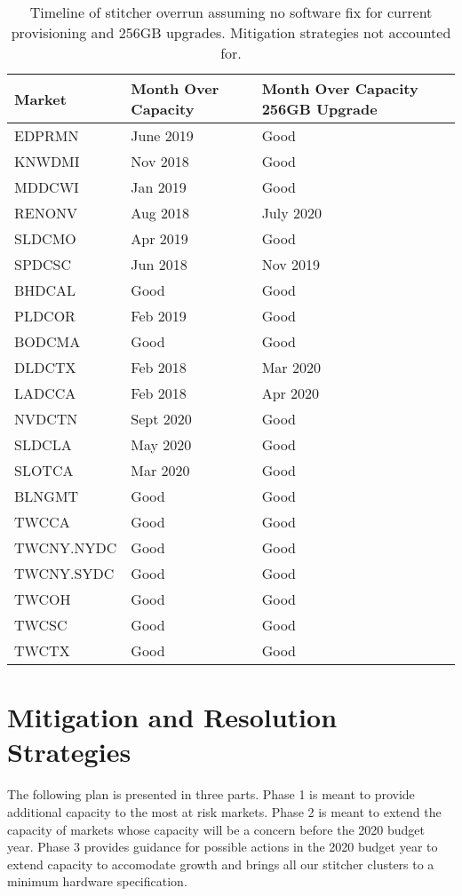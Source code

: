 \documentclass{article}
\begin{document}
\begin{table}
\begin{tabular}{|l|p{22mm}|p{26mm}|} 
\hline Market & Month Over Capacity & Month Over Capacity 256GB Upgrade\\
\hline EDPRMN & June 2019 & Good \\
\hline KNWDMI & Nov 2018 & Good \\
\hline MDDCWI & Jan 2019 & Good \\
\hline RENONV & Aug 2018 & July 2020 \\
\hline SLDCMO & Apr 2019 & Good \\
\hline SPDCSC & Jun 2018 & Nov 2019 \\
\hline BHDCAL & Good & Good \\
\hline PLDCOR & Feb 2019 & Good \\
\hline BODCMA & Good & Good \\
\hline DLDCTX & Feb 2018 & Mar 2020 \\
\hline LADCCA & Feb 2018 & Apr 2020\\
\hline NVDCTN & Sept 2020 & Good \\
\hline SLDCLA & May 2020 & Good \\
\hline SLOTCA & Mar 2020 & Good \\
\hline BLNGMT & Good & Good \\
\hline TWCCA & Good & Good \\
\hline TWCNY.NYDC & Good & Good \\
\hline TWCNY.SYDC & Good & Good \\
\hline TWCOH & Good & Good \\
\hline TWCSC & Good & Good \\
\hline TWCTX & Good & Good \\
\hline 
\end{tabular}
\caption{\label{TABLE-OverrunTimeline}Timeline of stitcher overrun assuming no software fix for current provisioning and 256GB upgrades. Mitigation strategies not accounted for.} 
\end{table}

\section{Mitigation and Resolution Strategies}
\label{SECTION-Mitigation}

The following plan is presented in three parts. Phase 1 is meant to provide additional capacity to the most at risk markets. Phase 2 is meant to extend the capacity of markets whose capacity will be a concern before the 2020 budget year. Phase 3 provides guidance for possible actions in the 2020 budget year to extend capacity to accomodate growth and brings all our stitcher clusters to a minimum hardware specification. 
\end{document}
